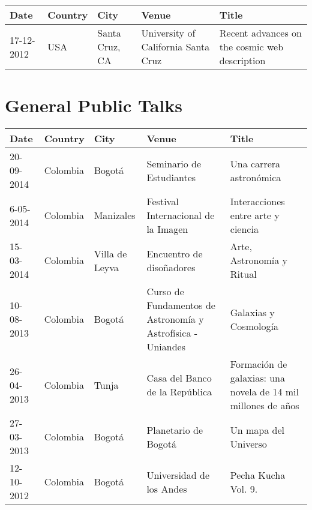 \documentclass{report}
\begin{document}
\begin{tabular}{p{2.0cm} p{1.5cm} p{1.8cm} p{2cm} p{5cm}}\hline
Date & Country & City& Venue & Title\\\hline
17-12-2012 & USA & Santa Cruz, CA & University of California Santa
Cruz & Recent advances on the cosmic web description  
\end{tabular}


\section*{General Public Talks}


\begin{tabular}{p{2.0cm} p{1.5cm} p{1.5cm} p{2cm} p{5cm}}\hline
Date & Country & City& Venue& Title\\\hline
20-09-2014 & Colombia & Bogot\'a & Seminario de Estudiantes & Una carrera astron\'omica \\
6-05-2014 & Colombia & Manizales & Festival Internacional de la Imagen & Interacciones entre arte y ciencia\\
15-03-2014  & Colombia & Villa de Leyva & Encuentro de diso\~nadores & Arte, Astronomía y Ritual \\
10-08-2013 & Colombia & Bogot\'a & Curso de Fundamentos de Astronom\'ia y Astrof\'isica - Uniandes &
Galaxias y Cosmolog\'ia\\
26-04-2013 & Colombia & Tunja & Casa del Banco de la Rep\'ublica &
Formaci\'on de galaxias: una novela de 14 mil millones de a\~nos\\  
27-03-2013 & Colombia & Bogot\'a & Planetario de Bogot\'a & Un mapa del
Universo\\
12-10-2012 & Colombia & Bogot\'a & Universidad de los Andes & Pecha
Kucha Vol. 9.
\end{tabular}
\end{document}

